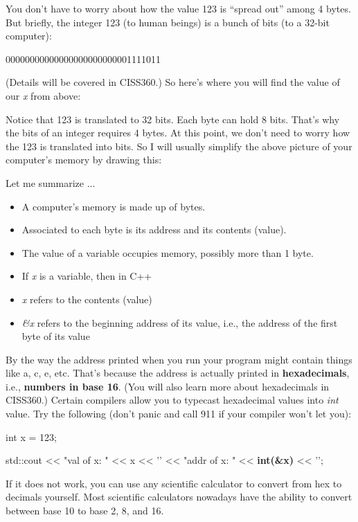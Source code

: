 You don't have to worry about how the value 123 is ``spread out'' among 4 bytes. But briefly, the integer 123 (to human beings) is a bunch of bits (to a 32-bit computer):
\begin{center}
00000000000000000000000001111011
\end{center}
(Details will be covered in CISS360.) So here's where you will find the value of our \emph{x} from above:

Notice that 123 is translated to 32 bits. Each byte can hold 8 bits. That's why the bits of an integer requires 4 bytes. At this point, we don't need to worry how the 123 is translated into bits. So I will usually simplify the above picture of your computer's memory by drawing this:

Let me summarize ...

\begin{itemize}
\item
  A computer's memory is made up of bytes.
\item
  Associated to each byte is its address and its contents (value).
\item
  The value of a variable occupies memory, possibly more than 1 byte.
\item
  If \emph{x} is a variable, then in C++
\item
  \emph{x} refers to the contents (value)
\item
  \emph{\&x} refers to the beginning address of its value, i.e., the
  address of the first byte of its value
\end{itemize}

By the way the address printed when you run your program might contain things like a, c, e, etc. That's because the address is actually printed in \textbf{hexadecimals}, i.e., \textbf{numbers in base 16}. (You will also learn more about hexadecimals in CISS360.) Certain compilers allow you to typecast hexadecimal values into \emph{int} value. Try the following (don't panic and call 911 if your compiler won't let you):

\begin{consolethree}[escapeinside=||]
int x = 123;

std::cout << "val of x: " << x
          << '\n' << "addr of x: " << \textbf{int(\&x)}
          << '\n';
\end{consolethree}
If it does not work, you can use any scientific calculator to convert from hex to decimals yourself. Most scientific calculators nowadays have the ability to convert between base 10 to base 2, 8, and 16.

